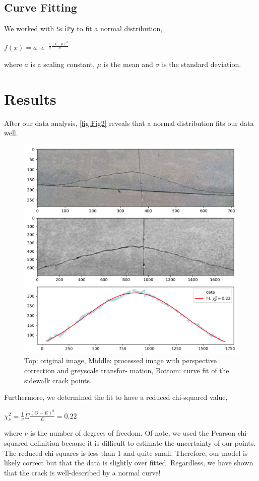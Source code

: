 \documentclass{article}
\begin{document}
\subsection{Curve Fitting}
We worked with \texttt{SciPy}\cite{2020NumPy-Array} to fit a normal distribution,
\begin{center}
    $f(x) = a\cdot e^{-\frac{1}{2} \frac{(x - \mu)^2}{\sigma}}$
\end{center}
where $a$ is a scaling constant, $\mu$ is the mean and $\sigma$ is the standard deviation.

\section{Results}
After our data analysis, \autoref{fig:Fig2} reveals that a normal distribution fits our data well.
\begin{figure}[H]
    \centering
\includegraphics[width=0.8\linewidth]{fit.png}
    \caption{Top: original image, Middle: processed image with perspective correction and greyscale transfor- mation, Bottom: curve fit of the sidewalk crack points.}
    \label{fig:Fig2}
\end{figure}
Furthermore, we determined the fit to have a reduced chi-squared value,
\begin{center}
    $\chi_\nu^2=\frac{1}{\nu} \Sigma \frac{(O-E)^2}{E} =0.22$
\end{center}
where $\nu$ is the number of degrees of freedom. Of note, we used the Pearson chi-squared definition because it is difficult to estimate the uncertainty of our points. The reduced chi-squares is less than 1 and quite small. Therefore, our model is likely correct but that the data is slightly over fitted. Regardless, we have shown that the crack is well-described by a normal curve!




\nocite{*}
\end{document}
